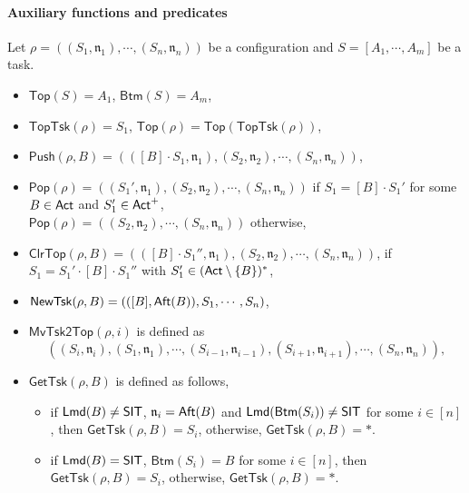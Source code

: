 \documentclass[preprint,12pt]{elsarticle}
\newcommand\act{{\sf Act}}
\newcommand\aft{{\sf Aft}}
\newcommand\lmd{{\sf Lmd}}
\newcommand\singleinstance{{\sf SIT}}
\newcommand\aname{\mathfrak{n}}
\newcommand\toptsk{\mathsf{TopTsk}}
\newcommand\topact{\mathsf{Top}}
\newcommand\btmact{\mathsf{Btm}}
\newcommand\push{\mathsf{Push}}
\newcommand\Pop{\mathsf{Pop}}
\newcommand\mvacttop{\mathsf{MvAct2Top}}
\newcommand\clrtop{\mathsf{ClrTop}}
\newcommand\clrtsk{\mathsf{ClrTsk}}
\newcommand\mvtsktop{\mathsf{MvTsk2Top}}
\newcommand\newtsk{\mathsf{NewTsk}}
\newcommand\gettsk{\mathsf{GetTsk}}
\begin{document}
	\paragraph{Auxiliary functions and predicates} 
	Let $\rho= ((S_1,\aname_1),\cdots, (S_n,\aname_n))$ be a configuration and $S=[A_1, \cdots, A_m]$ be a task. 
	\begin{itemize}
		\item $\topact(S) = A_1$, $\btmact(S) = A_m$,
		\item $\toptsk(\rho) = S_1$, $\topact(\rho) = \topact(\toptsk(\rho))$, 
		\item $\push(\rho, B) = (([B]\cdot S_1,\aname_1),(S_2,\aname_2),\cdots,(S_n,\aname_n))$,
		\item $\Pop(\rho) = ((S_1',\aname_1),(S_2,\aname_2), \cdots, (S_n,\aname_n))$ if $S_1=[B]\cdot S_1'$ for some $B\in\act$ and $S_1'\in\act^+$,\\ $\Pop(\rho) = ((S_2,\aname_2),\cdots,(S_n,\aname_n))$ otherwise,
		\item $\clrtop(\rho, B) = (([B]\cdot S_1'',\aname_1), (S_2,\aname_2), \cdots, (S_n,\aname_n))$, if $S_1=S_1'\cdot[B]\cdot S_1''$ with $S_1'\in (\act\setminus\{B\})^*$,
		\item $\newtsk(\rho, B) = (([B],\aft(B)), S_1, \cdots, S_n)$,
		\item $\mvtsktop(\rho, i)$ is defined as 
		$$((S_i,\aname_i), (S_1,\aname_1), \cdots, (S_{i-1},\aname_{i-1}), (S_{i+1},\aname_{i+1}), \cdots, (S_n,\aname_n)),$$
		\item $\gettsk(\rho, B)$ is defined as follows,
		\begin{itemize}
			\item if $\lmd(B)\neq\singleinstance$, $\aname_i=\aft(B)$ and $\lmd(\btmact(S_i)) \neq \singleinstance$ for some $i \in [n]$,  then $\gettsk(\rho, B) = S_i$, otherwise, $\gettsk(\rho, B) = *$.
			\item if $\lmd(B) = \singleinstance$, $\btmact(S_i)=B$ for some $i \in [n]$, then $\gettsk(\rho, B) = S_i$, otherwise, $\gettsk(\rho, B) = *$.
		\end{itemize}
	\end{itemize}
	
\end{document}
